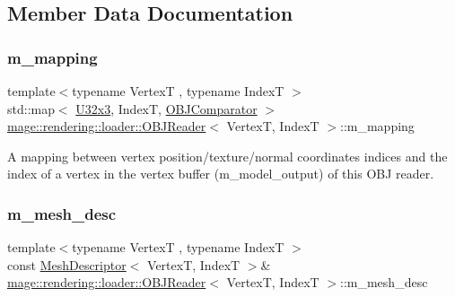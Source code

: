 \subsection{Member Data Documentation}
\mbox{\label{classmage_1_1rendering_1_1loader_1_1_o_b_j_reader_a4bad8aafabddb5cec68be8357d2d7566}} 
\subsubsection{\texorpdfstring{m\+\_\+mapping}{m\_mapping}}
{\footnotesize\ttfamily template$<$typename VertexT , typename IndexT $>$ \\
std\+::map$<$ \mbox{\hyperlink{namespacemage_a03e3b6f65630005f43a3112d1f6cf57b}{U32x3}}, IndexT, \mbox{\hyperlink{structmage_1_1rendering_1_1loader_1_1_o_b_j_reader_1_1_o_b_j_comparator}{O\+B\+J\+Comparator}} $>$ \mbox{\hyperlink{classmage_1_1rendering_1_1loader_1_1_o_b_j_reader}{mage\+::rendering\+::loader\+::\+O\+B\+J\+Reader}}$<$ VertexT, IndexT $>$\+::m\+\_\+mapping\hspace{0.3cm}{\ttfamily [private]}}

A mapping between vertex position/texture/normal coordinates\textquotesingle{} indices and the index of a vertex in the vertex buffer ({\ttfamily m\+\_\+model\+\_\+output}) of this O\+BJ reader. \mbox{\label{classmage_1_1rendering_1_1loader_1_1_o_b_j_reader_aa029c035456ea9456d63726b15e5db05}} 
\subsubsection{\texorpdfstring{m\+\_\+mesh\+\_\+desc}{m\_mesh\_desc}}
{\footnotesize\ttfamily template$<$typename VertexT , typename IndexT $>$ \\
const \mbox{\hyperlink{classmage_1_1rendering_1_1_mesh_descriptor}{Mesh\+Descriptor}}$<$ VertexT, IndexT $>$\& \mbox{\hyperlink{classmage_1_1rendering_1_1loader_1_1_o_b_j_reader}{mage\+::rendering\+::loader\+::\+O\+B\+J\+Reader}}$<$ VertexT, IndexT $>$\+::m\+\_\+mesh\+\_\+desc\hspace{0.3cm}{\ttfamily [private]}}

